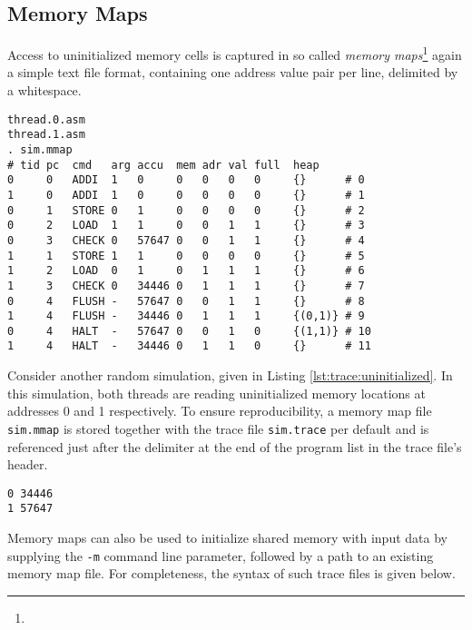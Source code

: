 \subsection*{Memory Maps}

Access to uninitialized memory cells is captured in so called \emph{memory maps}\footnote{} again a simple text file format, containing one address value pair per line, delimited by a whitespace.

\begin{lstlisting}[style=asm, caption={Output Trace Accessing Uninitialized Memory}, label={lst:trace:uninitialized}, xleftmargin=\parindent]
thread.0.asm
thread.1.asm
. sim.mmap
# tid pc  cmd   arg accu  mem adr val full  heap
0     0   ADDI  1   0     0   0   0   0     {}      # 0
1     0   ADDI  1   0     0   0   0   0     {}      # 1
0     1   STORE 0   1     0   0   0   0     {}      # 2
0     2   LOAD  1   1     0   0   1   1     {}      # 3
0     3   CHECK 0   57647 0   0   1   1     {}      # 4
1     1   STORE 1   1     0   0   0   0     {}      # 5
1     2   LOAD  0   1     0   1   1   1     {}      # 6
1     3   CHECK 0   34446 0   1   1   1     {}      # 7
0     4   FLUSH -   57647 0   0   1   1     {}      # 8
1     4   FLUSH -   34446 0   1   1   1     {(0,1)} # 9
0     4   HALT  -   57647 0   0   1   0     {(1,1)} # 10
1     4   HALT  -   34446 0   1   1   0     {}      # 11
\end{lstlisting}

Consider another random simulation, given in Listing \ref{lst:trace:uninitialized}.
In this simulation, both threads are reading uninitialized memory locations at addresses 0 and 1 respectively.
To ensure reproducibility, a memory map file \texttt{sim.mmap} is stored together with the trace file \texttt{sim.trace} per default and is referenced just after the delimiter at the end of the program list in the trace file's header.

\begin{lstlisting}[style=asm, caption={Output Memory Map of the Trace in Listing \ref{lst:trace:uninitialized}}, label={lst:mmap:uninitialized}, xleftmargin=0.39\textwidth]
0 34446
1 57647
\end{lstlisting}

Memory maps can also be used to initialize shared memory with input data by supplying the \texttt{-m} command line parameter, followed by a path to an existing memory map file.
For completeness, the syntax of such trace files is given below.


